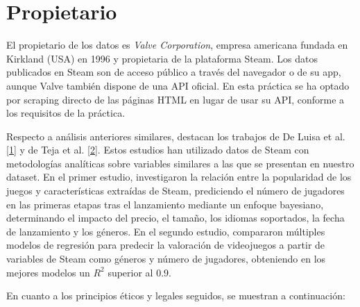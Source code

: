 \documentclass[
]{article}
\begin{document}
\section{Propietario}\label{propietario}

El propietario de los datos es \textit{Valve Corporation}, empresa americana fundada en Kirkland (USA) en 1996 y propietaria de la plataforma Steam. Los datos publicados en Steam son de acceso público a través del navegador o de su app, aunque Valve también dispone de una API oficial. En esta práctica se ha optado por scraping directo de las páginas HTML en lugar de usar su API, conforme a los requisitos de la práctica.

Respecto a análisis anteriores similares, destacan los trabajos de De Luisa et al. \hyperref[ref:Ref]{[1]} y de Teja et al. \hyperref[ref:Ref]{[2]}. Estos estudios han utilizado datos de Steam con metodologías analíticas sobre variables similares a las que se presentan en nuestro dataset. En el primer estudio, investigaron la relación entre la popularidad de los juegos y características extraídas de Steam, prediciendo el número de jugadores en las primeras etapas tras el lanzamiento mediante un enfoque bayesiano, determinando el impacto del precio, el tamaño, los idiomas soportados, la fecha de lanzamiento y los géneros. En el segundo estudio, compararon múltiples modelos de regresión para predecir la valoración de videojuegos a partir de variables de Steam como géneros y número de jugadores, obteniendo en los mejores modelos un $R^2$ superior al $0.9$.

En cuanto a los principios éticos y legales seguidos, se muestran a continuación:
\end{document}
